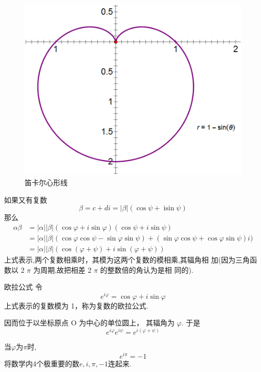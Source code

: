 \documentclass[13pt,fontset=mac]{ctexbeamer}
\begin{document}
\begin{frame}
	\begin{center}
		\begin{figure}[t]
			\includegraphics[scale=0.4]{r=1-sintheta.png}
			\caption{笛卡尔心形线~~~~~~}
		\end{figure}
		
	\end{center}
	
	
\end{frame}


\begin{frame}
	如果又有复数
	\[
	\beta=c+d {i}=|\beta|(\cos \psi+\operatorname{isin} \psi)
	\]
	那么
	\[
	\begin{aligned}
		\alpha \beta &=|\alpha||\beta|(\cos \varphi+i \operatorname{sin} \varphi)(\cos \psi+ i \operatorname{sin} \psi) \\
		&=|\alpha||\beta|(\cos \varphi \cos \psi-\sin \varphi \sin \psi)+(\sin \varphi \cos \psi+\cos \varphi \sin \psi) {i}) \\
		&=|\alpha||\beta|(\cos (\varphi+\psi)+i \operatorname{sin}(\varphi+\psi))
	\end{aligned}
	\]
	上式表示,两个复数相乘时，其模为这两个复数的模相乘,其辐角相 加(因为三角函数以 2 $\pi$ 为周期,故把相差 2 $\pi$ 的整数倍的角认为是相 同的).
\end{frame}

\begin{frame}{欧拉公式}
	令
	\[
	{e}^{{i} \varphi}=\cos \varphi+{i} \sin \varphi
	\]
	上式表示的复数模为 1，称为复数的\alert{欧拉公式}. 
	
	因而位于以坐标原点 O 为中心的单位圆上， 其辐角为 $\varphi$. 于是
	\[
	{e}^{{i} \varphi} {e}^{{i} \psi}={e}^{{i}(\varphi+\psi)}
	\]
	
	
	当$\varphi$为$\pi$时, $$ e^{i\pi }=-1$$
	将数学内4个极重要的数$e, i, \pi, -1 $连起来.
\end{frame}
\end{document}
